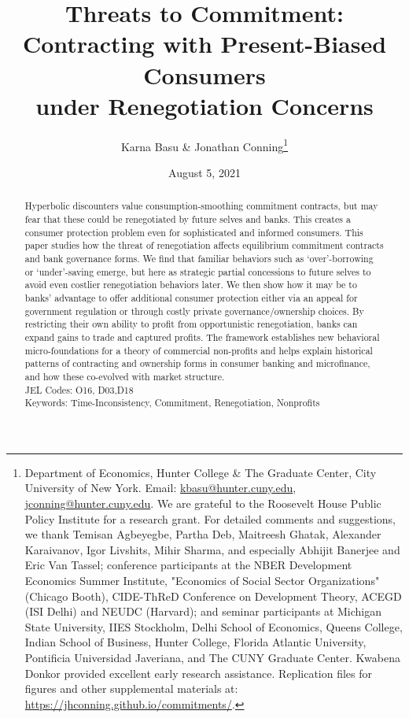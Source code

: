 \documentclass[11pt,english]{article}
\date{August 5, 2021}\usepackage{babel}
\theoremstyle{plain}
\theoremstyle{definition}
\begin{document}

\title{Threats to Commitment:\\Contracting with Present-Biased Consumers\\under Renegotiation Concerns}

\author{Karna Basu \& Jonathan Conning\thanks{Department of Economics, Hunter College \& The Graduate Center, City
University of New York. Email: \href{mailto:kbasu@hunter.cuny.edu}{kbasu@hunter.cuny.edu}, \href{mailto:jconning@hunter.cuny.edu}{jconning@hunter.cuny.edu}.
We are grateful to the Roosevelt House Public Policy Institute for a research grant. For detailed
comments and suggestions, we thank Temisan Agbeyegbe, Partha Deb, Maitreesh Ghatak, Alexander Karaivanov, Igor Livshits, Mihir Sharma, and especially Abhijit Banerjee and Eric Van Tassel; conference participants at the NBER Development
Economics Summer Institute, "Economics of Social Sector Organizations"
(Chicago Booth), CIDE-ThReD Conference on Development Theory, ACEGD
(ISI Delhi) and NEUDC (Harvard); and seminar participants
at Michigan State University, IIES Stockholm, Delhi School of Economics,
Queens College, Indian School of Business, Hunter College, Florida
Atlantic University, Pontificia Universidad Javeriana, and The CUNY Graduate
Center. Kwabena Donkor provided excellent early research assistance. Replication files for figures and other supplemental materials at:
\protect\url{https://jhconning.github.io/commitments/}.}}



\maketitle

\begin{abstract}
Hyperbolic discounters value consumption-smoothing commitment contracts, but may fear that these could be renegotiated by future selves and banks. This creates a consumer protection problem even for sophisticated and informed consumers. This paper studies how the threat of renegotiation affects equilibrium commitment contracts and bank governance forms. We find that familiar behaviors such as `over'-borrowing or `under'-saving emerge, but here as strategic partial concessions to future selves to avoid even costlier renegotiation behaviors later. We then show how it may be to banks' advantage to offer additional consumer protection either via an appeal for government regulation or through costly private governance/ownership choices. By restricting their own ability to profit from opportunistic renegotiation, banks can expand gains to trade and captured profits. The framework establishes new behavioral micro-foundations for a theory of commercial non-profits and helps explain historical patterns of contracting and ownership forms in consumer banking and microfinance, and how these co-evolved with market structure.   
\\JEL Codes: O16, D03,D18 
\\Keywords: Time-Inconsistency, Commitment, Renegotiation, Nonprofits
\end{abstract}
\vspace{\baselineskip}
\end{document}
